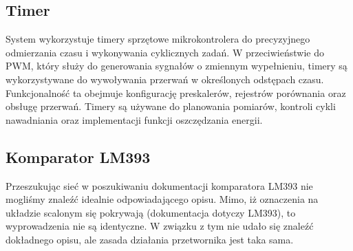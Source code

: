 \documentclass{article}
\begin{document}
\subsection{Timer}
System wykorzystuje timery sprzętowe mikrokontrolera do precyzyjnego odmierzania czasu i wykonywania cyklicznych zadań. W przeciwieństwie do PWM, który służy do generowania sygnałów o zmiennym wypełnieniu, timery są wykorzystywane do wywoływania przerwań w określonych odstępach czasu. Funkcjonalność ta obejmuje konfigurację preskalerów, rejestrów porównania oraz obsługę przerwań. Timery są używane do planowania pomiarów, kontroli cykli nawadniania oraz implementacji funkcji oszczędzania energii.











\subsection{Komparator LM393}
Przeszukując sieć w poszukiwaniu dokumentacji komparatora LM393 nie mogliśmy znaleźć idealnie odpowiadającego opisu. Mimo, iż oznaczenia na układzie scalonym się pokrywają (dokumentacja dotyczy LM393), to wyprowadzenia nie są identyczne. W związku z tym nie udało się znaleźć dokładnego opisu, ale zasada działania przetwornika jest taka sama. 
\end{document}
